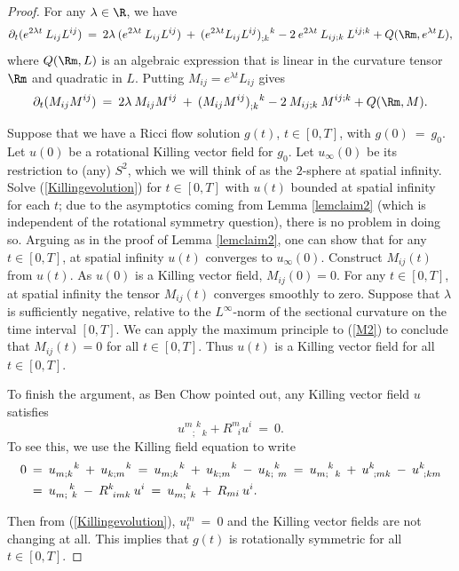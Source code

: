 \begin{proof}
For any $\lambda \in \R$, we have
\begin{equation}
\partial_t (e^{2\lambda t} \: L_{ij} L^{ij}) \:  = \:
2 \lambda \: (e^{2\lambda t} \: L_{ij} L^{ij}) \: + \:
(e^{2\lambda t} L_{ij} L^{ij})_{;k}^{\: \: \: \: k} -
2 \: e^{2\lambda t} \: L_{ij;k} \: L^{ij;k} + Q(\Rm, e^{\lambda t}L),
\end{equation}
where $Q(\Rm, L)$ is an algebraic expression that is
linear in the curvature tensor $\Rm$ and
quadratic in $L$.
Putting $M_{ij} = e^{\lambda t}L_{ij}$ gives
\begin{equation} \label{M2}
\partial_t (M_{ij} M^{ij}) \:  = \:
2 \lambda \: M_{ij} M^{ij} \: + \:
(M_{ij} M^{ij})_{;k}^{\: \: \: \: k} -
2 \: M_{ij;k} \: M^{ij;k} + Q(\Rm, M).
\end{equation}

Suppose that we have a Ricci flow solution $g(t)$, $t \in [0, T]$,
with $g(0) \: = \: g_0$. Let $u(0)$ be a rotational Killing vector field
for $g_0$. Let $u_\infty(0)$ be its restriction to (any) $S^2$, which we will
think of as the $2$-sphere at spatial infinity.
Solve (\ref{Killingevolution}) for $t \in [0, T]$ with $u(t)$ bounded at
spatial infinity for each $t$;
due to the asymptotics coming from Lemma \ref{lemclaim2}
(which is independent of the
rotational symmetry question), there is no problem
in doing so. Arguing as in the proof of Lemma \ref{lemclaim2},
one can show that
for any $t \in [0, T]$, at spatial infinity $u(t)$ converges to
$u_\infty(0)$.
Construct $M_{ij}(t)$ from $u(t)$. As $u(0)$ is a Killing vector field,
$M_{ij}(0) = 0$. For any $t \in [0, T]$,
at spatial infinity the tensor
$M_{ij}(t)$ converges smoothly to zero.
Suppose that $\lambda$ is sufficiently negative,
relative to the $L^\infty$-norm of the sectional curvature on the
time interval $[0, T]$.
We can apply the maximum principle to (\ref{M2}) to conclude that
$M_{ij}(t) = 0$ for all $t \in [0, T]$. Thus $u(t)$ is a Killing
vector field for all $t \in [0, T]$.

To finish the argument,
as Ben Chow pointed out, any Killing vector field $u$
satisfies
\begin{equation}
u^{m \: \: k}_{\: \: \: \: ;\: \: \:  k} + R^m_{\: \: \: i} u^i
\: = \: 0.
\end{equation}
To see this, we use the Killing field equation to write
\begin{align}
0 \: & = \: u_{m;k}^{\: \: \: \: \: \: \: \: k} \: + \:
u_{k;m}^{\: \: \: \: \: \: \: \: k} \: = \:
u_{m;k}^{\: \: \: \: \: \: \: \: k} \: + \:
u_{k;m}^{\: \: \: \: \: \: \: \: k} \: - \: u_{k; \: \: m}^{\: \: \: \: k}
\: = \:  u_{m; \: \: \: k}^{\: \: \: \: \: k} \: + \:
u_{\: \: ;mk}^{k} \: - \: u_{\: \: ;km}^{k} \\
& = \:
u_{m; \: \: k}^{\: \: \: \: \: \: k} \: - \: R^k_{\: \: imk} \: u^i \: = \:
u_{m; \: \: k}^{\: \: \: \: \: k} \: + \: R_{mi} \: u^i. \notag
\end{align}

Then from (\ref{Killingevolution}), $u_t^m \: = \: 0$ and the Killing vector
fields are not
changing at all.  This implies that $g(t)$ is rotationally
symmetric for all $t \in [0,T]$.
\end{proof}

